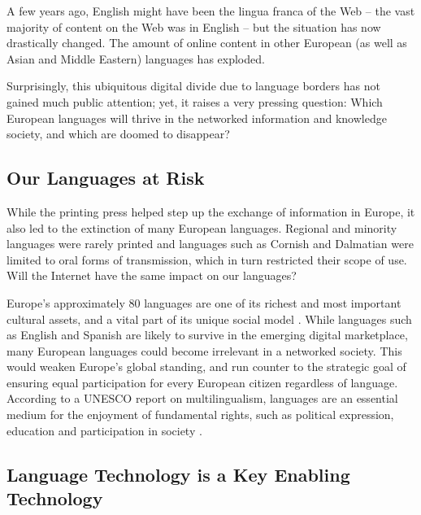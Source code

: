 \begin{multicols}{2}

A few years ago, English might have been the lingua franca of the Web -- the vast majority of content on the Web was in English -- but the situation has now drastically changed. The amount of online content in other European (as well as Asian and Middle Eastern) languages has exploded.

Surprisingly, this ubiquitous digital divide due to language borders has not gained much public attention; yet, it raises a very pressing question: Which European languages will thrive in the networked information and knowledge society, and which are doomed to disappear?

\subsection{Our Languages at Risk}

While the printing press helped step up the exchange of information in Europe, it also led to the extinction of many European languages. Regional and minority languages were rarely printed and languages such as Cornish and Dalmatian were limited to oral forms of transmission, which in turn restricted their scope of use. Will the Internet have the same impact on our languages?


Europe’s approximately 80 languages are one of its richest and most important cultural assets, and a vital part of its unique social model \cite{EC-multi}. While languages such as English and Spanish are likely to survive in the emerging digital marketplace, many European languages could become irrelevant in a networked society. This would weaken Europe’s global standing, and run counter to the strategic goal of ensuring equal participation for every European citizen regardless of language. According to a UNESCO report on multilingualism, languages are an essential medium for the enjoyment of fundamental rights, such as political expression, education and participation in society \cite{UN-mid}.

\subsection{Language Technology is a Key Enabling Technology}


\end{multicols}
